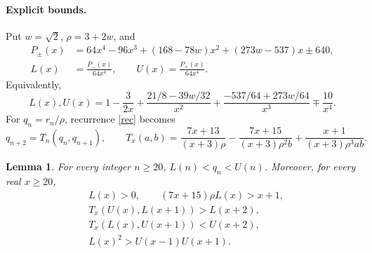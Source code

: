 \documentclass[11pt]{article}
\newtheorem{lemma}{Lemma}
\begin{document}
\paragraph{Explicit bounds.}
Put \(w=\sqrt2\), \(\rho=3+2w\), and
\begin{align*}
 P_\pm(x)&=64x^4-96x^3+(168-78w)x^2+(273w-537)x\pm640,\\
 L(x)&=\frac{P_-(x)}{64x^4},\qquad
 U(x)=\frac{P_+(x)}{64x^4}.
\end{align*}
Equivalently,
\[
 L(x),U(x)=1-\frac3{2x}
   +\frac{21/8-39w/32}{x^2}
   +\frac{-537/64+273w/64}{x^3}
   \mp\frac{10}{x^4}.
\]
For \(q_n=r_n/\rho\), recurrence \eqref{rec} becomes
\begin{equation}\label{T}
 q_{n+2}=T_n(q_n,q_{n+1}),\qquad
 T_x(a,b)=\frac{7x+13}{(x+3)\rho}
 -\frac{7x+15}{(x+3)\rho^2b}
 +\frac{x+1}{(x+3)\rho^3ab}.
\end{equation}

\begin{lemma}\label{bounds}
For every integer \(n\ge20\), \(L(n)<q_n<U(n)\).
Moreover, for every real \(x\ge20\),
\begin{align}
 &L(x)>0,\qquad (7x+15)\rho L(x)>x+1,\label{pos}\\
 &T_x(U(x),L(x+1))>L(x+2),\label{lower}\\
 &T_x(L(x),U(x+1))<U(x+2),\label{upper}\\
 &L(x)^2>U(x-1)U(x+1).\label{lc}
\end{align}
\end{lemma}
\end{document}

